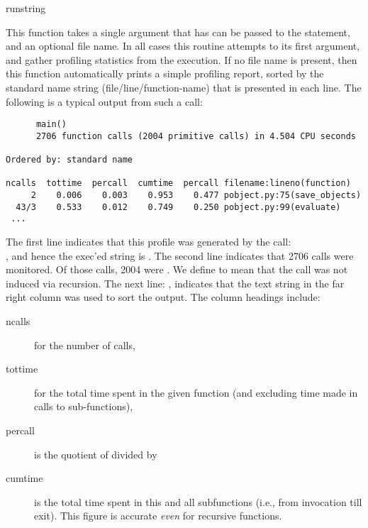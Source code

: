 \begin{funcdesc}{run}{string}

This function takes a single argument that has can be passed to the
 statement, and an optional file name.  In all cases this
routine attempts to  its first argument, and gather profiling
statistics from the execution. If no file name is present, then this
function automatically prints a simple profiling report, sorted by the
standard name string (file/line/function-name) that is presented in
each line.  The following is a typical output from such a call:

\begin{verbatim}
      main()
      2706 function calls (2004 primitive calls) in 4.504 CPU seconds

Ordered by: standard name

ncalls  tottime  percall  cumtime  percall filename:lineno(function)
     2    0.006    0.003    0.953    0.477 pobject.py:75(save_objects)
  43/3    0.533    0.012    0.749    0.250 pobject.py:99(evaluate)
 ...
\end{verbatim}

The first line indicates that this profile was generated by the call:\\
, and hence the exec'ed string is
.  The second line indicates that 2706 calls were
monitored.  Of those calls, 2004 were .  We define
 to mean that the call was not induced via recursion.
The next line: , indicates that
the text string in the far right column was used to sort the output.
The column headings include:

\begin{description}

\item[ncalls ]
for the number of calls, 

\item[tottime ]
for the total time spent in the given function (and excluding time
made in calls to sub-functions),

\item[percall ]
is the quotient of  divided by 

\item[cumtime ]
is the total time spent in this and all subfunctions (i.e., from
invocation till exit). This figure is accurate \emph{even} for recursive
functions.


\end{description}
\end{funcdesc}

